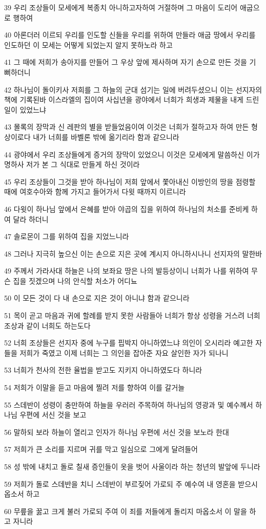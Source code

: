 \par 39 우리 조상들이 모세에게 복종치 아니하고자하여 거절하며 그 마음이 도리어 애굽으로 행하여
\par 40 아론더러 이르되 우리를 인도할 신들을 우리를 위하여 만들라 애굽 땅에서 우리를 인도하던 이 모세는 어떻게 되었는지 알지 못하노라 하고
\par 41 그 때에 저희가 송아지를 만들어 그 우상 앞에 제사하며 자기 손으로 만든 것을 기뻐하더니
\par 42 하나님이 돌이키사 저희를 그 하늘의 군대 섬기는 일에 버려두셨으니 이는 선지자의 책에 기록된바 이스라엘의 집이여 사십년을 광야에서 너희가 희생과 제물을 내게 드린 일이 있었느냐
\par 43 몰록의 장막과 신 레판의 별을 받들었음이여 이것은 너희가 절하고자 하여 만든 형상이로다 내가 너희를 바벨론 밖에 옮기리라 함과 같으니라
\par 44 광야에서 우리 조상들에게 증거의 장막이 있었으니 이것은 모세에게 말씀하신 이가 명하사 저가 본 그 식대로 만들게 하신 것이라
\par 45 우리 조상들이 그것을 받아 하나님이 저희 앞에서 쫓아내신 이방인의 땅을 점령할 때에 여호수아와 함께 가지고 들어가서 다윗 때까지 이르니라
\par 46 다윗이 하나님 앞에서 은혜를 받아 야곱의 집을 위하여 하나님의 처소를 준비케 하여 달라 하더니
\par 47 솔로몬이 그를 위하여 집을 지었느니라
\par 48 그러나 지극히 높으신 이는 손으로 지은 곳에 계시지 아니하시나니 선지자의 말한바
\par 49 주께서 가라사대 하늘은 나의 보좌요 땅은 나의 발등상이니 너희가 나를 위하여 무슨 집을 짓겠으며 나의 안식할 처소가 어디뇨
\par 50 이 모든 것이 다 내 손으로 지은 것이 아니냐 함과 같으니라
\par 51 목이 곧고 마음과 귀에 할례를 받지 못한 사람들아 너희가 항상 성령을 거스려 너희 조상과 같이 너희도 하는도다
\par 52 너희 조상들은 선지자 중에 누구를 핍박지 아니하였느냐 의인이 오시리라 예고한 자들을 저희가 죽였고 이제 너희는 그 의인을 잡아준 자요 살인한 자가 되나니
\par 53 너희가 천사의 전한 율법을 받고도 지키지 아니하였도다 하니라
\par 54 저희가 이말을 듣고 마음에 찔려 저를 향하여 이를 갈거늘
\par 55 스데반이 성령이 충만하여 하늘을 우러러 주목하여 하나님의 영광과 및 예수께서 하나님 우편에 서신 것을 보고
\par 56 말하되 보라 하늘이 열리고 인자가 하나님 우편에 서신 것을 보노라 한대
\par 57 저희가 큰 소리를 지르며 귀를 막고 일심으로 그에게 달려들어
\par 58 성 밖에 내치고 돌로 칠새 증인들이 옷을 벗어 사울이라 하는 청년의 발앞에 두니라
\par 59 저희가 돌로 스데반을 치니 스데반이 부르짖어 가로되 주 예수여 내 영혼을 받으시옵소서 하고
\par 60 무릎을 꿇고 크게 불러 가로되 주여 이 죄를 저들에게 돌리지 마옵소서 이 말을 하고 자니라

